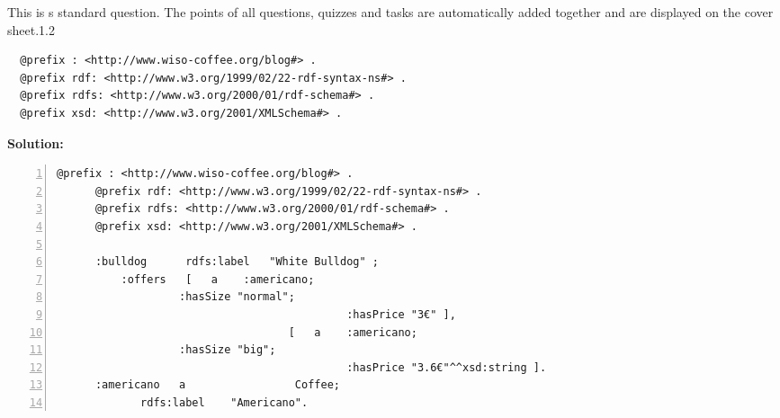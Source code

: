 \newpage
\begin{question}{6}{This is s standard question. The points of all questions, quizzes and tasks are automatically added together and are displayed on the cover sheet.}{1.2}{}{}{}{}
		\begin{problem}
    		\begin{Verbatim}
  @prefix : <http://www.wiso-coffee.org/blog#> .
  @prefix rdf: <http://www.w3.org/1999/02/22-rdf-syntax-ns#> .
  @prefix rdfs: <http://www.w3.org/2000/01/rdf-schema#> .
  @prefix xsd: <http://www.w3.org/2001/XMLSchema#> .
			\end{Verbatim}
		\end{problem}
			
		\begin{solution}
			\textbf{Solution:}
            \begin{Verbatim}[frame=single, numbers=left, fontsize=\footnotesize]
      @prefix : <http://www.wiso-coffee.org/blog#> .
      @prefix rdf: <http://www.w3.org/1999/02/22-rdf-syntax-ns#> .
      @prefix rdfs: <http://www.w3.org/2000/01/rdf-schema#> .
      @prefix xsd: <http://www.w3.org/2001/XMLSchema#> .
      
      :bulldog      rdfs:label   "White Bulldog" ;
		  :offers	[   a    :americano;
				   :hasSize "normal";
                                             :hasPrice "3€" ],
                              		[   a    :americano;
				   :hasSize "big";
                                             :hasPrice "3.6€"^^xsd:string ].
      :americano   a                 Coffee;
		     rdfs:label    "Americano".
            \end{Verbatim}
		\end{solution}
\end{question}